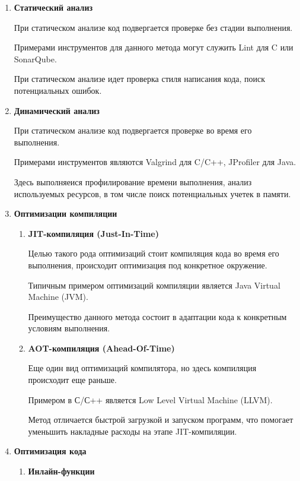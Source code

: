 \documentclass{mipt-thesis-bs}
\begin{document}
\begin{enumerate}
\item \textbf{Статический анализ}

При статическом анализе код подвергается проверке без стадии выполнения.

Примерами инструментов для данного метода могут служить Lint для C или SonarQube.

При статическом анализе идет проверка стиля написания кода, поиск потенциальных ошибок.

\item \textbf{Динамический анализ}

При статическом анализе код подвергается проверке во время его выполнения.

Примерами инструментов являются Valgrind для C/C++, JProfiler для Java.

Здесь выполняеися профилирование времени выполнения, анализ используемых ресурсов, в том числе
поиск потенциальных учетек в памяти.

\item \textbf{Оптимизации компиляции}
    \begin{enumerate}
        \item \textbf{JIT-компиляция (Just-In-Time)}

        Целью такого рода оптимизаций стоит компиляция кода во время его выполнения, происходит
        оптимизация под конкретное окружение.

        Типичным примером оптимизаций компиляции является Java Virtual Machine (JVM).

        Преимущество данного метода состоит в адаптации кода к конкретным условиям выполнения.

        \item \textbf{AOT-компиляция (Ahead-Of-Time)}

        Еще один вид оптимизаций компилятора, но здесь компиляция происходит еще раньше.

        Примером в С/С++ является Low Level Virtual Machine (LLVM).

        Метод отличается быстрой загрузкой и запуском программ, что помогает уменьшить накладные
        расходы на этапе JIT-компиляции.
    \end{enumerate}

\item \textbf{Оптимизация кода}
    \begin{enumerate}
        \item \textbf{Инлайн-функции}


\end{enumerate}
\end{enumerate}
\end{document}
